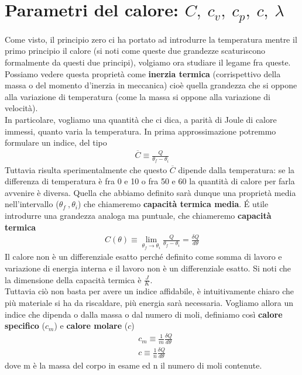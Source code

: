 \documentclass[
10pt, %
a4paper, %
oneside, %
headinclude,footinclude, %
BCOR5mm, %
]{scrartcl}
\begin{document}
\section{Parametri del calore: \(C,\ c_v,\ c_p,\ c,\ \lambda \)}
Come visto, il principio zero ci ha portato ad introdurre la temperatura mentre il primo principio il calore (si noti come queste due grandezze scaturiscono formalmente da questi due principi), volgiamo ora studiare il legame fra queste. Possiamo vedere questa proprietà come \textbf{inerzia termica} (corrispettivo della massa o del momento d'inerzia in meccanica) cioè quella grandezza che si oppone alla variazione di temperatura (come la massa si oppone alla variazione di velocità).  \\
In particolare, vogliamo una quantità che ci dica, a parità di Joule di calore immessi, quanto varia la temperatura. In prima approssimazione potremmo formulare un indice, del tipo
\begin{align*} 
	\overline{C} \equiv \frac{Q}{\theta_f - \theta_i}
\end{align*} 
Tuttavia risulta sperimentalmente che questo $\overline{C}$ dipende dalla temperatura: se la differenza di temperatura è fra 0 e 10 o fra 50 e 60 la quantità di calore per farla avvenire è diversa. Quella che abbiamo definito sarà dunque una proprietà media nell'intervallo ($\theta_f\ , \theta_i$) che chiameremo \textbf{capacità termica media}. \'{E} utile introdurre una grandezza analoga ma puntuale, che chiameremo \textbf{capacità termica}
\begin{align*} 
	C(\theta) \equiv \lim_{\theta_f \to \theta_i} \frac{Q}{\theta_f - \theta_i} = \frac{\delta Q}{d \theta}
\end{align*} 
Il calore non è un differenziale esatto perché definito come somma di lavoro e variazione di energia interna e il lavoro non è un differenziale esatto. Si noti che la dimensione della capacità termica è $\frac{J}{K}$.\\
Tuttavia ciò non basta per avere un indice affidabile, è intuitivamente chiaro che più materiale si ha da riscaldare, più energia sarà necessaria. Vogliamo allora un indice che dipenda o dalla massa o dal numero di moli, definiamo così \textbf{calore specifico} ($c_m$) e \textbf{calore molare} ($c$)
\begin{align*} 
	&c_m \equiv \frac{1}{m} \frac{\delta Q}{d\theta}\\
	&c \equiv \frac{1}{n} \frac{\delta Q}{d\theta}
\end{align*} 
dove m è la massa del corpo in esame ed n il numero di moli contenute.\\
\end{document}
